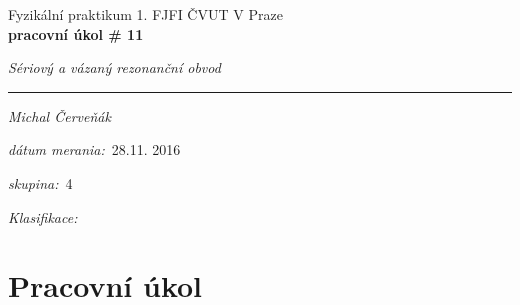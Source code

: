 \documentclass[a4paper,10pt]{article}
\begin{document}
\def\mean#1{\left< #1 \right>}
\noindent
{\large Fyzikální praktikum 1.} \hfil {\large FJFI ČVUT V Praze}\\
\noindent
{\large\textbf{pracovní úkol \# 11}}
\begin{center}
{\large\textit{Sériový a vázaný rezonanční obvod }}
\end{center}
\noindent
\rule{\textwidth}{1px}
\vspace{\baselineskip}

\emph{Michal Červeňák}
\par
\vspace{\baselineskip}
\begin{minipage}[l]{0.5\textwidth}%
\textit{dátum merania:}~28.11. 2016\\%
\par%
\noindent%
\textit{skupina:}~4\\%
\par%
\noindent%
\textit{Klasifikace:}\dotfill\\%
\end{minipage}

\section{Pracovní úkol}
\end{document}

